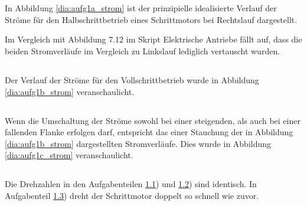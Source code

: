 %
%
%
%
\chapter{}\label{ex:aufg1}

\section{}\label{sec:aufg1a}
In Abbildung \ref{dia:aufg1a_strom} ist der prinzipielle idealisierte Verlauf der Ströme für den Halbschrittbetrieb eines Schrittmotors bei Rechtslauf dargestellt.



Im Vergleich mit Abbildung 7.12 im Skript Elektrische Antriebe fällt auf, dass die beiden Stromverläufe im Vergleich zu Linkslauf lediglich vertauscht wurden.

\section{}\label{sec:aufg1b}
Der Verlauf der Ströme für den Vollschrittbetrieb wurde in Abbildung \ref{dia:aufg1b_strom} veranschaulicht.



\section{}\label{sec:aufg1c}
Wenn die Umschaltung der Ströme sowohl bei einer steigenden, als auch bei einer fallenden Flanke erfolgen darf, entspricht das einer Stauchung der in Abbildung \ref{dia:aufg1b_strom} dargestellten Stromverläufe. Dies wurde in Abbildung \ref{dia:aufg1c_strom} veranschaulicht.



\section{}\label{sec:aufg1d}
Die Drehzahlen in den Aufgabenteilen \ref{sec:aufg1a}) und \ref{sec:aufg1b}) sind identisch. In Aufgabenteil \ref{sec:aufg1c}) dreht der Schrittmotor doppelt so schnell wie zuvor.

\clearpage